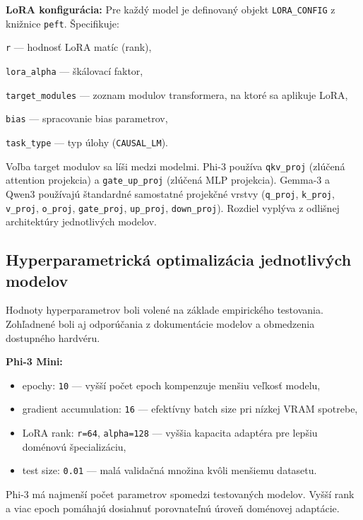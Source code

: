 \textbf{LoRA konfigurácia:}
Pre každý model je definovaný objekt \texttt{LORA\_CONFIG} z knižnice \texttt{peft}. Špecifikuje:\par\medskip
\noindent\texttt{r} — hodnosť LoRA matíc (rank),\par\medskip
\noindent\texttt{lora\_alpha} — škálovací faktor,\par\medskip
\noindent\texttt{target\_modules} — zoznam modulov transformera, na ktoré sa aplikuje LoRA,\par\medskip
\noindent\texttt{bias} — spracovanie bias parametrov,\par\medskip
\noindent\texttt{task\_type} — typ úlohy (\texttt{CAUSAL\_LM}).\par\medskip
 
Voľba target modulov sa líši medzi modelmi. Phi-3 používa \texttt{qkv\_proj} (zlúčená attention projekcia) a \texttt{gate\_up\_proj} (zlúčená MLP projekcia). Gemma-3 a Qwen3 používajú štandardné samostatné projekčné vrstvy (\texttt{q\_proj}, \texttt{k\_proj}, \texttt{v\_proj}, \texttt{o\_proj}, \texttt{gate\_proj}, \texttt{up\_proj}, \texttt{down\_proj}). Rozdiel vyplýva z odlišnej architektúry jednotlivých modelov.
 
\subsection{Hyperparametrická optimalizácia jednotlivých modelov}
 
Hodnoty hyperparametrov boli volené na základe empirického testovania. Zohľadnené boli aj odporúčania z dokumentácie modelov a obmedzenia dostupného hardvéru.\par\medskip
 
\textbf{Phi-3 Mini:}
\begin{itemize}
    \item epochy: \texttt{10} — vyšší počet epoch kompenzuje menšiu veľkosť modelu,
    \item gradient accumulation: \texttt{16} — efektívny batch size pri nízkej VRAM spotrebe,
    \item LoRA rank: \texttt{r=64}, \texttt{alpha=128} — vyššia kapacita adaptéra pre lepšiu doménovú špecializáciu,
    \item test size: \texttt{0.01} — malá validačná množina kvôli menšiemu datasetu.
\end{itemize}
 
Phi-3 má najmenší počet parametrov spomedzi testovaných modelov. Vyšší rank a viac epoch pomáhajú dosiahnuť porovnateľnú úroveň doménovej adaptácie.
 
